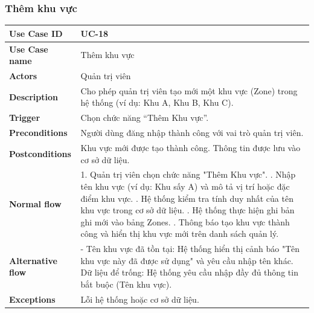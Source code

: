 \subsubsection{Thêm khu vực}
\begin{tabular}{|p{3.5cm}|p{9.5cm}|}
\hline
\textbf{Use Case ID} & UC-18 \\
\hline
\textbf{Use Case name} & Thêm khu vực \\
\hline
\textbf{Actors} & Quản trị viên \\
\hline
\textbf{Description} & 
Cho phép quản trị viên tạo mới một khu vực (Zone) trong hệ thống 
(ví dụ: Khu A, Khu B, Khu C). \\
\hline
\textbf{Trigger} & 
Chọn chức năng “Thêm Khu vực”. \\
\hline
\textbf{Preconditions} & 
 Người dùng đăng nhập thành công với vai trò quản trị viên.
 \\
\hline
\textbf{Postconditions} & 
Khu vực mới được tạo thành công.\newline
Thông tin được lưu vào cơ sở dữ liệu.
 \\
\hline
\textbf{Normal flow} & 
1. Quản trị viên chọn chức năng "Thêm Khu vực". \newline
2. Nhập tên khu vực (ví dụ: Khu sấy A) và mô tả vị trí hoặc đặc điểm khu vực. \newline
3. Hệ thống kiểm tra tính duy nhất của tên khu vực trong cơ sở dữ liệu. \newline
4. Hệ thống thực hiện ghi bản ghi mới vào bảng Zones. \newline
5. Thông báo tạo khu vực thành công và hiển thị khu vực mới trên danh sách quản lý.
 \\
\hline
\textbf{Alternative flow} & 
- Tên khu vực đã tồn tại: Hệ thống hiển thị cảnh báo "Tên khu vực này đã được sử dụng" và yêu cầu nhập tên khác.\newline
Dữ liệu để trống: Hệ thống yêu cầu nhập đầy đủ thông tin bắt buộc (Tên khu vực).
 \\
\hline
\textbf{Exceptions} & 
Lỗi hệ thống hoặc cơ sở dữ liệu. \\
\hline
\end{tabular}

